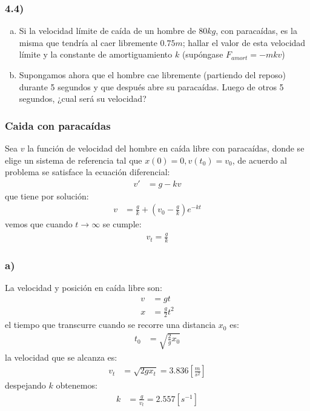 \documentclass{article}
\begin{document}
\subsubsection*{4.4)}
\begin{enumerate}[a)]
    \item Si la velocidad límite de caída de un hombre de $80kg$, con paracaídas, es 
    la misma que tendría al caer libremente $0.75m$; hallar el valor de esta velocidad 
    límite y la constante de amortiguamiento $k$ (supóngase $F_{amort} = -mkv$)
    \item Supongamos ahora que el hombre cae libremente (partiendo del reposo) durante 
    5 segundos y que después abre su paracaídas. Luego de otros 5 segundos, ¿cual será su 
    velocidad? 
\end{enumerate}
\begin{tcolorbox}[breakable]
    \subsubsection*{Caida con paracaídas}
    Sea $v$ la función de velocidad del hombre en caída libre con paracaídas, donde se elige 
    un sistema de referencia tal que $x(0)=0, v(t_0) = v_0$, de acuerdo al problema se 
    satisface la ecuación diferencial:
    \begin{align*}
        v' &= g - kv 
    \end{align*}
    que tiene por solución:
    \begin{align*}
        v &= \frac{g}{k} + \left(v_0 - \frac{g}{k}\right)e^{-kt}
    \end{align*}
    vemos que cuando $t \to \infty$ se cumple:
    \begin{align*}
        v_t = \frac{g}{k}
    \end{align*}
    \subsubsection*{a)}
    La velocidad y posición en caída libre son:
    \begin{align*}
        v &= gt \\
        x &= \frac{g}{2}t^2 
    \end{align*}
    el tiempo que transcurre cuando se recorre una distancia $x_0$ es:
    \begin{align*}
        t_0 
        &= \sqrt{\frac{2}{g}x_0} 
    \end{align*}
    la velocidad que se alcanza es:
    \begin{align*}
        v_t 
        &= \sqrt{2gx_t} = 3.836 \left[ \frac{m}{s^2} \right]
    \end{align*}
    despejando $k$ obtenemos:
    \begin{align*}
        k 
        &= \frac{g}{v_t} = 2.557 [s^{-1}]
    \end{align*}

\end{tcolorbox}
\end{document}

